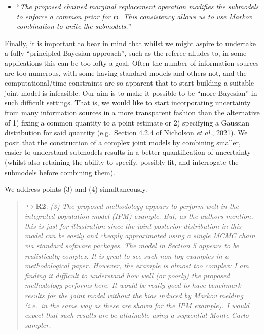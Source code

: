 \documentclass[
  10pt,
  a4paper,
]{article}
\providecommand{\tightlist}{%
  \setlength{\itemsep}{0pt}\setlength{\parskip}{0pt}}
\begin{document}
\begin{itemize}
\tightlist
\item
  ``\emph{The proposed chained marginal replacement operation modifies
  the submodels to enforce a common prior for \(\boldsymbol{\phi}\).
  This consistency allows us to use Markov combination to unite the
  submodels.}''
\end{itemize}

Finally, it is important to bear in mind that whilst we might aspire to
undertake a fully ``principled Bayesian approach'', such as the referee
alludes to, in some applications this can be too lofty a goal. Often the
number of information sources are too numerous, with some having
standard models and others not, and the computational/time constraints
are so apparent that to start building a suitable joint model is
infeasible. Our aim is to make it possible to be ``more Bayesian'' in
such difficult settings. That is, we would like to start incorporating
uncertainty from many information sources in a more transparent fashion
than the alternative of 1) fixing a common quantity to a point estimate
or 2) specifying a Gaussian distribution for said quantity (e.g.~Section
4.2.4 of
\protect\hyperlink{ref-nicholson_interoperability_2021}{Nicholson
\emph{et al.}, 2021}). We posit that the construction of a complex joint
models by combining smaller, easier to understand submodels results in a
better quantification of uncertainty (whilst also retaining the ability
to specify, possibly fit, and interrogate the submodels before combining
them).

\par

\noindent\hrulefill

\par

We address points (3) and (4) simultaneously.

\begin{quote}
\(\hookrightarrow\)\textbf{R2}: \emph{(3) The proposed methodology
appears to perform well in the integrated-population-model (IPM)
example. But, as the authors mention, this is just for illustration
since the joint posterior distribution in this model can be easily and
cheaply approximated using a single MCMC chain via standard software
packages.} \emph{The model in Section 5 appears to be realistically
complex. It is great to see such non-toy examples in a methodological
paper. However, the example is almost too complex: I am finding it
difficult to understand how well (or poorly) the proposed methodology
performs here. It would be really good to have benchmark results for the
joint model without the bias induced by Markov melding (i.e.~in the same
way as these are shown for the IPM example). I would expect that such
results are be attainable using a sequential Monte Carlo sampler.}
\end{quote}
\end{document}
